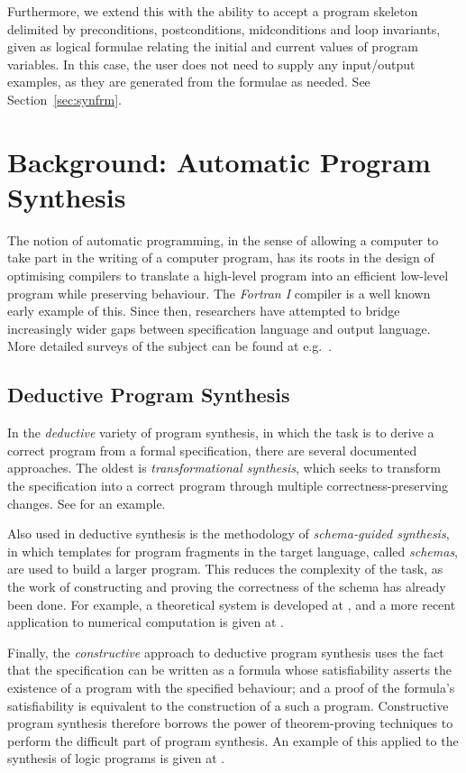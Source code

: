 \documentclass[a4paper,twoside,notitlepage]{article}
\begin{document}
Furthermore, we extend this with the ability to accept a program skeleton 
delimited by preconditions, postconditions, midconditions and loop 
invariants, given as logical formulae relating the initial and current 
values of program variables. In this case, the user does not need to 
supply any input/output examples, as they are generated from the formulae 
as needed. See Section~\ref{sec:synfrm}.
\clearpage

\section{Background: Automatic Program Synthesis} \label{sec:bkgsyn}

The notion of automatic programming, in the sense of 
allowing a computer to take part in the writing of a computer program, has its 
roots in the design of optimising compilers to translate a high-level program 
into an efficient low-level program while preserving behaviour. The 
\emph{Fortran I} compiler\cite{fortran} is a well known early example of this. 
Since then, researchers have attempted to bridge increasingly wider gaps 
between specification language and output language. More detailed surveys of 
the subject can be found at e.g.\ 
\cite{goldberg86}\cite{deville94}\cite{basin04}.

\subsection{Deductive Program Synthesis}

In the \emph{deductive} variety of program synthesis, in which the task is to 
derive a correct program from a formal specification, there are several 
documented approaches. The oldest is \emph{transformational synthesis}, which 
seeks to transform the specification into a correct program through multiple 
correctness-preserving changes. See \cite{cheatham86} for an example.

Also used in deductive synthesis is the methodology of \emph{schema-guided 
synthesis}, in which templates for program fragments in the target language, 
called \emph{schemas}, are used to build a larger program. This reduces the 
complexity of the task, as the work of constructing and proving the 
correctness of the schema has already been done. For example, a theoretical 
system is developed at \cite{flener97}, and a more recent application to 
numerical computation is given at \cite{colon05}.

Finally, the \emph{constructive} approach to deductive program synthesis uses 
the fact that the specification can be written as a formula whose 
satisfiability asserts the existence of a program with the specified 
behaviour; and a proof of the formula's satisfiability is equivalent to the 
construction of a such a program. Constructive program synthesis therefore 
borrows the power of theorem-proving techniques to perform the difficult part 
of program synthesis. An example of this applied to the synthesis of logic 
programs is given at \cite{bundy90}.
\end{document}
